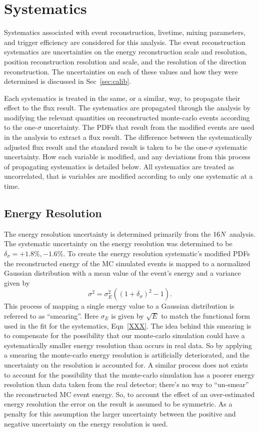 \section{Systematics}
Systematics associated with event reconstruction, livetime, mixing parameters,
and trigger efficiency are considered for this analysis.
The event reconstruction systematics are uncertainties on the energy reconstruction
scale and resolution, position reconstruction resolution and scale, and the
resolution of the direction reconstruction.
The uncertainties on each of these values and how they were determined is
discussed in Sec~\ref{sec:calib}.

Each systematics is treated in the same, or a similar, way, to propagate
their effect to the flux result.
The systematics are propagated through the analysis by modifying the
relevant quantities on reconstructed monte-carlo events according to the
one-$\sigma$ uncertainty.
The PDFs that result from the modified events are used in the analysis to extract
a flux result.
The difference between the systematically adjusted flux result and the standard
result is taken to be the one-$\sigma$ systematic uncertainty.
How each variable is modified, and any deviations from this process of
propagating systematics is detailed below.
All systematics are treated as uncorrelated, that is variables are modified according to
only one systematic at a time.

\subsection{Energy Resolution}
The energy resolution uncertainty is determined primarily from the $\ce{16}N$ analysis.
The systematic uncertainty on the energy resolution was determined to be $\delta_{\sigma} = +1.8\%, -1.6\%$. %
To create the energy resolution systematic's modified PDFs the reconstructed
energy of the MC simulated events is mapped to a normalized Gaussian distribution with a
mean value of the event's energy and a
variance given by
\begin{equation}
  \sigma^{2} = \sigma_{E}^{2}\left(\left(1 + \delta_{\sigma}\right)^2 - 1\right)\text{.}
  \label{eqn:systmatic_esmear}
\end{equation}
This process of mapping a single energy value to a Gaussian distribution is referred to as ``smearing''.
Here $\sigma_{E}$ is given by $\sqrt{E}$ to match the functional form used in the fit for the systematics,
Eqn~\ref{XXX}.
The idea behind this smearing is to compensate for the possibility that our monte-carlo simulation could have
a systematically smaller energy resolution than occurs in real data.
So by applying a smearing the monte-carlo energy resolution is artificially deteriorated, and the uncertainty
on the resolution is accounted for.
A similar process does not exists to account for the possibility that the monte-carlo simulation has a poorer
energy resolution than data taken from the real detector; there's no way to ``un-smear'' the reconstructed MC
event energy.
So, to account the effect of an over-estimated energy resolution the error on the result is assumed to be symmetric.
As a penalty for this assumption the larger uncertainty between the positive and negative uncertainty on the
energy resolution is used.

